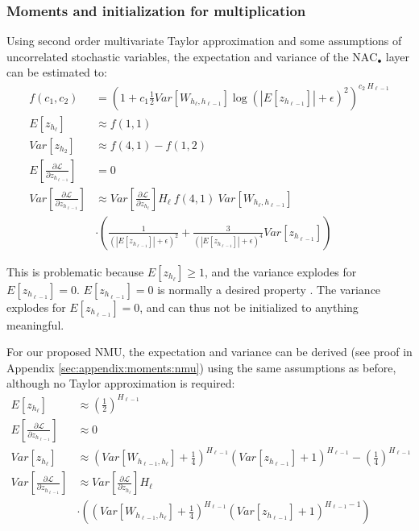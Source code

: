 \subsubsection{Moments and initialization for multiplication}
Using second order multivariate Taylor approximation and some assumptions of uncorrelated stochastic variables, the expectation and variance of the $\mathrm{NAC}_{\bullet}$ layer can be estimated to:
\begin{equation}
\begin{aligned}
f(c_1, c_2) &= \left(1 + c_1 \frac{1}{2} Var[W_{h_\ell, h_{\ell-1}}] \log(|E[z_{h_{\ell-1}}]| + \epsilon)^2\right)^{c_2\ H_{\ell-1}} \\
E[z_{h_\ell}] &\approx f\left(1, 1\right) \\
Var[z_{h_2}] &\approx f\left(4, 1\right) - f\left(1, 2\right) \\
E\left[\frac{\partial \mathcal{L}}{\partial z_{h_{\ell-1}}}\right] &= 0 \\
Var\left[\frac{\partial \mathcal{L}}{\partial z_{h_{\ell-1}}}\right] &\approx Var\left[\frac{\partial \mathcal{L}}{\partial z_{h_{\ell}}}\right] H_{\ell}\ f\left(4, 1\right)\ Var[W_{h_{\ell}, h_{\ell-1}}] \\
&\cdot \left(\frac{1}{\left(|E[z_{h_{\ell-1}}]| + \epsilon\right)^2} + \frac{3}{\left(|E[z_{h_{\ell-1}}]| + \epsilon\right)^4} Var[z_{h_{\ell-1}}]\right)
\end{aligned}
\end{equation}

This is problematic because $E[z_{h_\ell}] \ge 1$, and the variance explodes for $E[z_{h_{\ell-1}}] = 0$. $E[z_{h_{\ell-1}}] = 0$ is normally a desired property \cite{glorot-initialization}. The variance explodes for $E[z_{h_{\ell-1}}] = 0$, and can thus not be initialized to anything meaningful.

For our proposed NMU, the expectation and variance can be derived (see proof in Appendix \ref{sec:appendix:moments:nmu}) using the same assumptions as before, although no Taylor approximation is required:
\begin{equation}
\begin{aligned}
E[z_{h_\ell}] &\approx \left(\frac{1}{2}\right)^{H_{\ell-1}} \\
E\left[\frac{\partial \mathcal{L}}{\partial z_{h_{\ell-1}}}\right] &\approx 0 \\
Var[z_{h_\ell}] &\approx \left(Var[W_{h_{\ell-1},h_\ell}] + \frac{1}{4}\right)^{H_{\ell-1}} \left(Var[z_{h_{\ell-1}}] + 1\right)^{H_{\ell-1}} - \left(\frac{1}{4}\right)^{H_{\ell-1}} \\
Var\left[\frac{\partial \mathcal{L}}{\partial z_{h_{\ell-1}}}\right] &\approx Var\left[\frac{\partial \mathcal{L}}{\partial z_{h_\ell}}\right] H_\ell \\
&\cdot \left(
\left(Var[W_{h_{\ell-1},h_\ell}] + \frac{1}{4}\right)^{H_{\ell-1}} \left(Var[z_{h_{\ell-1}}] + 1\right)^{H_{\ell-1} - 1}\right)
\end{aligned}
\end{equation}

